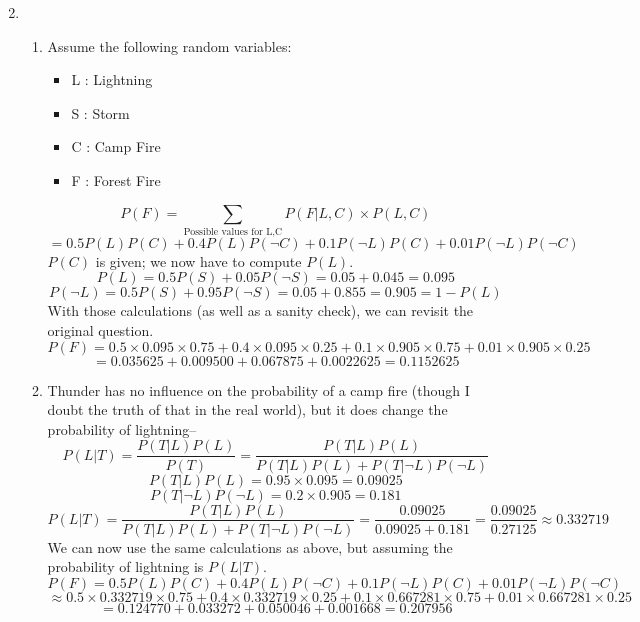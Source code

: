 \documentclass{article}
\begin{document}
\fancyhfoffset[L]{0cm}
\fancyhfoffset[R]{0cm}
\rhead{\today}

\begin{enumerate}
    \setcounter{enumi}{1}
    \item
    \begin{enumerate}
        \item
            Assume the following random variables:\\
            \begin{itemize}
                \item
                L : Lightning

                \item
                S : Storm

                \item
                C : Camp Fire

                \item
                F : Forest Fire
            \end{itemize}
            $$P(F) = \sum_{\text{Possible values for L,C}} P(F|L,C)\times P(L,C)$$
            $$ = 0.5P(L)P(C) + 0.4P(L)P(\neg C) + 0.1P(\neg L)P(C) + 0.01P(\neg L)P(\neg C)$$
            $P(C)$ is given; we now have to compute $P(L)$.
            $$P(L) = 0.5P(S) + 0.05P(\neg S) = 0.05 + 0.045 = 0.095$$
            $$P(\neg L) = 0.5P(S) + 0.95P(\neg S) = 0.05 + 0.855 = 0.905 = 1 - P(L)$$
            With those calculations (as well as a sanity check), we can revisit the original question.
            $$P(F) = 0.5\times0.095\times0.75 +
                0.4\times0.095\times0.25 + 
                0.1\times0.905\times0.75 +
                0.01\times0.905\times0.25$$
            $$ = 0.035625 + 0.009500 + 0.067875 + 0.0022625 = 0.1152625 $$

        \item
            Thunder has no influence on the probability of a camp fire (though I doubt the truth of that in the real world), but it does change the probability of lightning--
            $$P(L|T) = \frac{P(T|L)P(L)}{P(T)} = \frac{P(T|L)P(L)}{P(T|L)P(L) + P(T|\neg L)P(\neg L)}$$
            $$P(T|L)P(L) = 0.95 \times 0.095 = 0.09025$$
            $$P(T|\neg L)P(\neg L) = 0.2\times 0.905 = 0.181$$
            $$P(L|T) = \frac{P(T|L)P(L)}{P(T|L)P(L) + P(T|\neg L)P(\neg L)} = \frac{0.09025}{0.09025+0.181} = \frac{0.09025}{0.27125} \approx 0.332719$$
            We can now use the same calculations as above, but assuming the probability of lightning is $P(L|T)$.
            $$P(F) = 0.5P(L)P(C) + 0.4P(L)P(\neg C) + 0.1P(\neg L)P(C) + 0.01P(\neg L)P(\neg C)$$
            $$ \approx 0.5\times0.332719\times0.75 + 0.4\times0.332719\times0.25 + 0.1\times0.667281\times0.75 + 0.01\times0.667281\times0.25$$
            $$ = 0.124770 + 0.033272 + 0.050046 + 0.001668 = 0.207956$$


\end{enumerate}
\end{enumerate}
\end{document}
